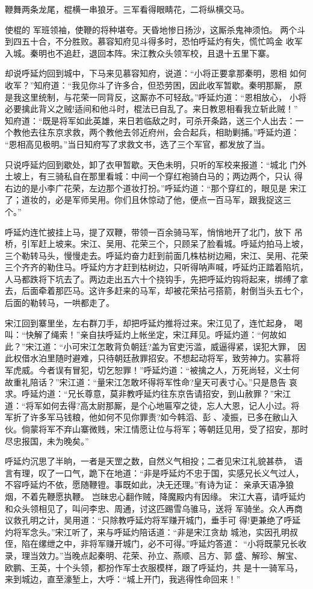 鞭舞两条龙尾，棍横一串狼牙。三军看得眼睛花，二将纵横交马。

使棍的
军班领袖，使鞭的将种堪夸。天昏地惨日扬沙，这厮杀鬼神须怕。
两个斗到四五十合，不分胜败。慕容知府见斗得多时，恐怕呼延灼有失，慌忙鸣金
收军入城。秦明也不追赶，退回本阵。宋江教众头领军校，且退十五里下寨。

却说呼延灼回到城中，下马来见慕容知府，说道：“小将正要拿那秦明，恩相
如何收军？”知府道：“我见你斗了许多合，但恐劳困，因此收军暂歇。秦明那厮，
原是我这里统制，与花荣一同背反，这厮亦不可轻敌。”呼延灼道：“恩相放心，
小将必要擒此背义之贼!适间和他斗时，棍法已自乱了。来日教恩相看我立斩此贼！”
知府道：“既是将军如此英雄，来日若临敌之时，可杀开条路，送三个人出去：一
个教他去往东京求救，两个教他去邻近府州，会合起兵，相助剿捕。”呼延灼道：
“恩相高见极明。”当日知府写了求救文书，选了三个军官，都发放了当。

只说呼延灼回到歇处，卸了衣甲暂歇。天色未明，只听的军校来报道：“城北
门外土坡上，有三骑私自在那里看城：中间一个穿红袍骑白马的；两边两个，只认
得右边的是小李广花荣，左边那个道妆打扮。”呼延灼道：“那个穿红的，眼见是
宋江了；道妆的，必是军师吴用。你们且休惊动了他，便点一百马军，跟我捉这三
个。”

呼延灼连忙披挂上马，提了双鞭，带领一百余骑马军，悄悄地开了北门，放下
吊桥，引军赶上坡来。宋江、吴用、花荣三个，只顾呆了脸看城。呼延灼拍马上坡，
三个勒转马头，慢慢走去。呼延灼奋力赶到前面几株枯树边厢，宋江、吴用、花荣
三个齐齐的勒住马。呼延灼方才赶到枯树边，只听得呐声喊，呼延灼正踏着陷坑，
人马都跌将下坑去了。两边走出五六十个挠钩手，先把呼延灼钩将起来，绑缚了拿
去，后面牵着那匹马。这许多赶来的马军，却被花荣拈弓搭箭，射倒当头五七个，
后面的勒转马，一哄都走了。

宋江回到寨里坐，左右群刀手，却把呼延灼推将过来。宋江见了，连忙起身，
喝叫：“快解了绳索！”亲自扶呼延灼上帐坐定，宋江拜见。呼延灼道：“何故如
此？”宋江道：“小可宋江怎敢背负朝廷?盖为官吏污滥，威逼得紧，误犯大罪，
因此权借水泊里随时避难，只待朝廷赦罪招安。不想起动将军，致劳神力。实慕将
军虎威。今者误有冒犯，切乞恕罪！”呼延灼道：“被擒之人，万死尚轻，义士何
故重礼陪话？”宋江道：“量宋江怎敢坏得将军性命?皇天可表寸心。”只是恳告
哀求。呼延灼道：“兄长尊意，莫非教呼延灼往东京告请招安，到山赦罪？”宋江
道：“将军如何去得?高太尉那厮，是个心地匾窄之徒，忘人大恩，记人小过。将
军折了许多军马钱粮，他如何不见你罪责?如今韩滔、彭、凌振，已多在敝山入
伙。倘蒙将军不弃山寨微贱，宋江情愿让位与将军；等朝廷见用，受了招安，那时
尽忠报国，未为晚矣。”

呼延灼沉思了半晌，一者是天罡之数，自然义气相投；二者见宋江礼貌甚恭，
语言有理，叹了一口气，跪下在地道：“非是呼延灼不忠于国，实感兄长义气过人，
不容呼延灼不依，愿随鞭镫。事既如此，决无还理。”有诗为证：
亲承天语净狼烟，不着先鞭愿执鞭。
岂昧忠心翻作贼，降魔殿内有因缘。
宋江大喜，请呼延灼和众头领相见了，叫问李忠、周通，讨这匹踢雪乌骓马，送将
军骑坐。众人再商议救孔明之计，吴用道：“只除教呼延灼将军赚开城门，垂手可
得!更兼绝了呼延灼将军念头。”宋江听了，来与呼延灼陪话道：“非是宋江贪劫
城池，实因孔明叔侄，陷在缧绁之中，非将军赚开城门，必不可得。”呼延灼答道：
“小将既蒙兄长收录，理当效力。”当晚点起秦明、花荣、孙立、燕顺、吕方、郭
盛、解珍、解宝、欧鹏、王英，十个头领，都扮作军士衣服模样，跟了呼延灼，共
是十一骑军马，来到城边，直至濠堑上，大呼：“城上开门，我逃得性命回来！”


